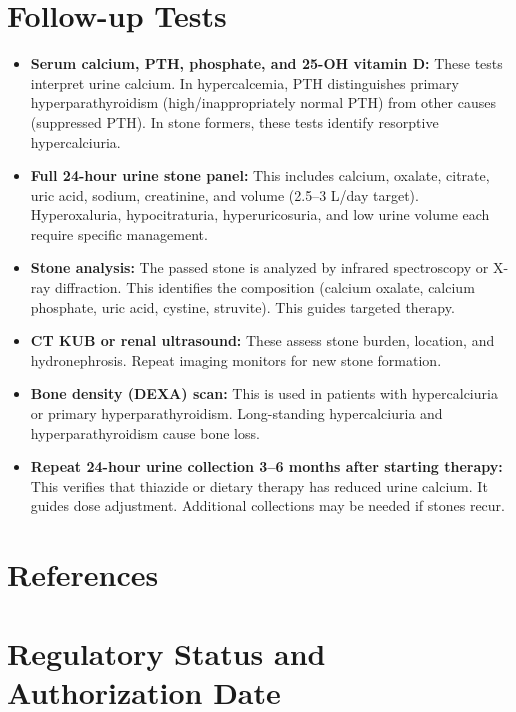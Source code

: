 \section*{Follow-up Tests}
\begin{itemize}
  \item \textbf{Serum calcium, PTH, phosphate, and 25-OH vitamin D:} These tests interpret urine calcium. In hypercalcemia, PTH distinguishes primary hyperparathyroidism (high/inappropriately normal PTH) from other causes (suppressed PTH). In stone formers, these tests identify resorptive hypercalciuria.
  \item \textbf{Full 24-hour urine stone panel:} This includes calcium, oxalate, citrate, uric acid, sodium, creatinine, and volume (2.5--3 L/day target). Hyperoxaluria, hypocitraturia, hyperuricosuria, and low urine volume each require specific management.
  \item \textbf{Stone analysis:} The passed stone is analyzed by infrared spectroscopy or X-ray diffraction. This identifies the composition (calcium oxalate, calcium phosphate, uric acid, cystine, struvite). This guides targeted therapy.
  \item \textbf{CT KUB or renal ultrasound:} These assess stone burden, location, and hydronephrosis. Repeat imaging monitors for new stone formation.
  \item \textbf{Bone density (DEXA) scan:} This is used in patients with hypercalciuria or primary hyperparathyroidism. Long-standing hypercalciuria and hyperparathyroidism cause bone loss.
  \item \textbf{Repeat 24-hour urine collection 3--6 months after starting therapy:} This verifies that thiazide or dietary therapy has reduced urine calcium. It guides dose adjustment. Additional collections may be needed if stones recur.
\end{itemize}

\section*{References}



\clearpage
\section*{Regulatory Status and Authorization Date}

\clearpage
